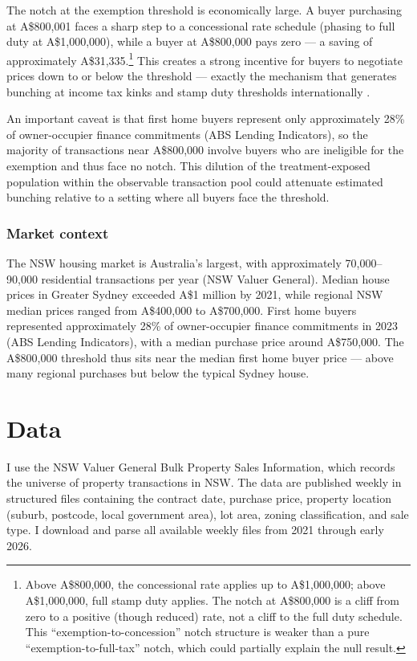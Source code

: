 \documentclass[12pt]{article}
\begin{document}
The notch at the exemption threshold is economically large. A buyer purchasing at A\$800,001 faces a sharp step to a concessional rate schedule (phasing to full duty at A\$1,000,000), while a buyer at A\$800,000 pays zero --- a saving of approximately A\$31,335.\footnote{Above A\$800,000, the concessional rate applies up to A\$1,000,000; above A\$1,000,000, full stamp duty applies. The notch at A\$800,000 is a cliff from zero to a positive (though reduced) rate, not a cliff to the full duty schedule. This ``exemption-to-concession'' notch structure is weaker than a pure ``exemption-to-full-tax'' notch, which could partially explain the null result.} This creates a strong incentive for buyers to negotiate prices down to or below the threshold --- exactly the mechanism that generates bunching at income tax kinks \citep{saez2010} and stamp duty thresholds internationally \citep{best2018,skov2020}.

An important caveat is that first home buyers represent only approximately 28\% of owner-occupier finance commitments (ABS Lending Indicators), so the majority of transactions near A\$800,000 involve buyers who are ineligible for the exemption and thus face no notch. This dilution of the treatment-exposed population within the observable transaction pool could attenuate estimated bunching relative to a setting where all buyers face the threshold.

\subsubsection*{Market context} The NSW housing market is Australia's largest, with approximately 70,000--90,000 residential transactions per year (NSW Valuer General). Median house prices in Greater Sydney exceeded A\$1 million by 2021, while regional NSW median prices ranged from A\$400,000 to A\$700,000. First home buyers represented approximately 28\% of owner-occupier finance commitments in 2023 (ABS Lending Indicators), with a median purchase price around A\$750,000. The A\$800,000 threshold thus sits near the median first home buyer price --- above many regional purchases but below the typical Sydney house.

\section{Data}
\label{sec:data}

I use the NSW Valuer General Bulk Property Sales Information, which records the universe of property transactions in NSW. The data are published weekly in structured files containing the contract date, purchase price, property location (suburb, postcode, local government area), lot area, zoning classification, and sale type. I download and parse all available weekly files from 2021 through early 2026.
\end{document}
